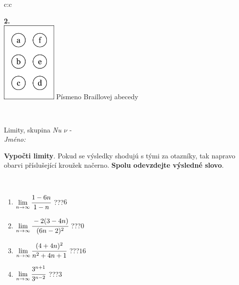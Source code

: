 \documentclass[10pt]{report}
\begin{document}
\begin{tabular}{c:c}
\begin{minipage}[c][104.5mm][t]{0.5\linewidth}
\begin{center}
\begin{minipage}{0.20\linewidth}
\begin{center}
{\Huge\bfseries 2.} \\[2mm]
\includegraphics[height=40mm]{../images/braille.png}
{\small Písmeno Braillovej abecedy}
\end{center}
\end{minipage}
\end{center}
\end{minipage}
\\ \hdashline
\begin{minipage}[c][104.5mm][t]{0.5\linewidth}
\begin{center}
\vspace{7mm}
{\huge Limity, skupina \textit{Nu $\nu$} -}\\[5mm]
\textit{Jméno:}\phantom{xxxxxxxxxxxxxxxxxxxxxxxxxxxxxxxxxxxxxxxxxxxxxxxxxxxxxxxxxxxxxxxxx}\\[5mm]
\begin{minipage}{0.95\linewidth}
\begin{center}
\textbf{Vypočti limity}. Pokud se výsledky shodujú s tými za otazníky, tak napravo\\obarvi příslušející kroužek načerno. \textbf{Spolu odevzdejte výsledné slovo}.
\end{center}
\end{minipage}
\\[1mm]
\begin{minipage}{0.79\linewidth}
\begin{center}
\begin{varwidth}{\linewidth}
\begin{enumerate}
\normalsize
\item $\lim\limits_{n\to\infty}\cfrac{1-6n}{1-n}$\quad \dotfill\; ???\;\dotfill \quad $6$
\item $\lim\limits_{n\to\infty}\cfrac{-2(3-4n)}{(6n-2)^2}$\quad \dotfill\; ???\;\dotfill \quad $0$
\item $\lim\limits_{n\to\infty}\cfrac{(4+4n)^2}{n^2+4n+1}$\quad \dotfill\; ???\;\dotfill \quad $16$
\item $\lim\limits_{n\to\infty}\cfrac{3^{n+1}}{3^{n-2}}$\quad \dotfill\; ???\;\dotfill \quad $3$

\end{enumerate}
\end{varwidth}
\end{center}
\end{minipage}
\end{center}
\end{minipage}
\end{tabular}
\end{document}

